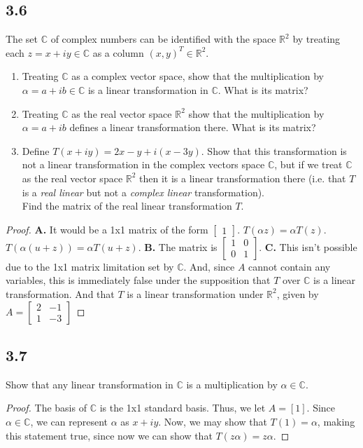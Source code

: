 \documentclass{amsart}
\begin{document}
\subsection*{3.6} The set $\mathbb{C}$ of complex numbers can be identified with the space $\mathbb{R}^2$ by treating each $z = x + iy \in \mathbb{C}$ as a column $(x,y)^T \in \mathbb{R}^2$.
\begin{enumerate}[label=\alph*)]
   \item Treating $\mathbb{C}$ as a complex vector space, show that the multiplication by $\alpha = a + ib \in \mathbb{C}$ is a linear transformation in $\mathbb{C}$. What is its matrix?
    
    \item Treating $\mathbb{C}$ as the real vector space $\mathbb{R}^2$ show that the multiplication by $\alpha = a + ib$ defines a linear transformation there. What is its matrix?
    
    \item Define $T(x+iy) = 2x-y+i(x-3y)$. Show that this transformation is not a linear transformation in the complex vectors space $\mathbb{C}$, but if we treat $\mathbb{C}$ as the real vector space $\mathbb{R}^2$ then it is a linear transformation there (i.e. that $T$ is a \textit{real linear} but not a \textit{complex linear} transformation).\\
    Find the matrix of the real linear transformation $T$.
\end{enumerate}
\begin{proof}
    \textbf{A.} It would be a 1x1 matrix of the form $\begin{bmatrix}  1  \end{bmatrix}$. $T(\alpha z) = \alpha T(z)$. $T(\alpha(u+z)) = \alpha T(u+z)$.
    \textbf{B.} The matrix is $\begin{bmatrix} 1 & 0 \\ 0 & 1 \end{bmatrix}$.
    \textbf{C.} This isn't possible due to the 1x1 matrix limitation set by $\mathbb{C}$. And, since $A$ cannot contain any variables, this is immediately false under the supposition that $T$ over $ \mathbb{C}$ is a linear transformation. And that $T$ is a linear transformation under $\mathbb{R}^2$, given by $A = \begin{bmatrix} 2 & -1 \\ 1 & -3   \end{bmatrix}$
\end{proof}
\subsection*{3.7} Show that any linear transformation in $\mathbb{C}$ is a multiplication by $\alpha \in \mathbb{C}$.
\begin{proof}
    The basis of $\mathbb{C}$ is the 1x1 standard basis. Thus, we let $A = [1]$. Since $\alpha \in \mathbb{C}$, we can represent $\alpha$ as $x+iy$. Now, we may show that $T(1) = \alpha$, making this statement true, since now we can show that $T(z\alpha) = z\alpha$. 
\end{proof}
\end{document}
